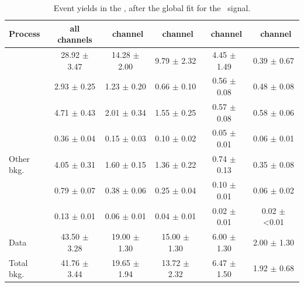 \begin{table}[htbp]
	\centering
	\caption{Event yields in the \TTCR, after the global fit for the \Zut\ signal. }
	
	\begin{tabular} {l c c c c c }
		\toprule
		Process &   all channels & \mumumu\ channel & \emumu\ channel & \eemu\ channel &\eee\ channel \\
		\midrule
		\NPL\ \ttbar& 28.92 $ \pm $ 3.47 & 14.28 $\pm$ 2.00 &  9.79 $\pm$ 2.32 & 4.45 $\pm$ 1.49 & 0.39 $\pm$ 0.67 \\ 
		\ttZ 		&  2.93 $ \pm $ 0.25 &  1.23 $\pm$ 0.20 &  0.66 $\pm$ 0.10 & 0.56 $\pm$ 0.08 & 0.48 $\pm$ 0.08 \\ 
		\WZ			&  4.71 $ \pm $ 0.43 &  2.01 $\pm$ 0.34 &  1.55 $\pm$ 0.25 & 0.57 $\pm$ 0.08 & 0.58 $\pm$ 0.06 \\ 
		\ZZ 		&  0.36 $ \pm $ 0.04 &  0.15 $\pm$ 0.03 &  0.10 $\pm$ 0.02 & 0.05 $\pm$ 0.01 & 0.06 $\pm$ 0.01 \\ 
		Other bkg. 	&  4.05 $ \pm $ 0.31 &  1.60 $\pm$ 0.15 &  1.36 $\pm$ 0.22 & 0.74 $\pm$ 0.13 & 0.35 $\pm$ 0.08 \\ 
		\tZq 		&  0.79 $ \pm $ 0.07 &  0.38 $\pm$ 0.06 &  0.25 $\pm$ 0.04 & 0.10 $\pm$ 0.01 & 0.06 $\pm$ 0.02 \B\\ 
		\hdashline
		\kZut  		&  0.13 $ \pm $ 0.01 &  0.06 $\pm$ 0.01 &  0.04 $\pm$ 0.01 & 0.02 $\pm$ 0.01 & 0.02 $\pm$ <0.01  \T\B\\
		\hdashline
		Data 		& 43.50 $ \pm $ 3.28 & 19.00 $\pm$ 1.30 & 15.00 $\pm$ 1.30 & 6.00 $\pm$ 1.30 & 2.00 $\pm$ 1.30 \T\\
		Total bkg.	& 41.76 $ \pm $ 3.44 & 19.65 $\pm$ 1.94 & 13.72 $\pm$ 2.32 & 6.47 $\pm$ 1.50 & 1.92 $\pm$ 0.68\\
		\bottomrule
	\end{tabular}
	\label{tab:PYieldTTCR}
\end{table}
